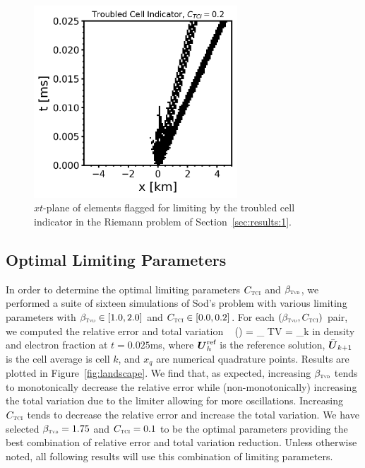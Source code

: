 \documentclass[onecolumn]{aastex62}
\newcommand{\TVD}{\textnormal{\tiny\textsc{Tvd}}}
\newcommand{\TCI}{\textnormal{\tiny\textsc{TCI}}}
\begin{document}
\begin{figure}
  \includegraphics[width=18pc]{optimal_shock.png}
  \caption{$xt$-plane of elements flagged for limiting by the troubled cell indicator
  in the Riemann problem of Section~\ref{sec:results:1}.}
  \label{fig:shock}
\end{figure}

\subsection{Optimal Limiting Parameters}
\label{sec:param}
In order to determine the optimal limiting parameters $C_{\TCI}$ and $\beta_{\TVD}$,
we performed a suite of sixteen simulations of Sod's problem with various
limiting parameters with $\beta_{\TVD}\in\left[1.0,2.0\right]$ and
$C_{\TCI}\in\left[0.0,0.2\right]$. For each $\left(\beta_{\TVD},C_{\TCI}\right)$ pair,
we computed the relative error and total variation \
\beq
  \varepsilon() = \sum_{\bK}\left\lvert{}\right\rvert \quad\quad
  TV = \sum_{k}\abs{ \bar{\vect{U}}_{k+1} - \bar{\vect{U}}_{k} }
\eeq
 in density and electron
fraction at $t = 0.025$ms, where $\boldsymbol{U}_{h}^{\text{ref}} $ is the reference
solution, $\bar{\boldsymbol{U}}_{k+1}$ is the cell average is cell $k$, and $x_{q}$ are
numerical quadrature points.
Results are plotted in Figure~\ref{fig:landscape}.
We find that, as expected, increasing $\beta_{\TVD}$ tends to monotonically
decrease the relative error while (non-monotonically) increasing the total variation due to the
limiter allowing for more oscillations. Increasing $C_{\TCI}$ tends to decrease
the relative error and increase the total variation.
We have selected
$\beta_{\TVD}=1.75$ and $C_{\TCI}=0.1$ to be the optimal parameters providing
the best combination of relative error and total variation reduction. Unless
otherwise noted, all following results will use this combination of limiting
parameters.
\end{document}
